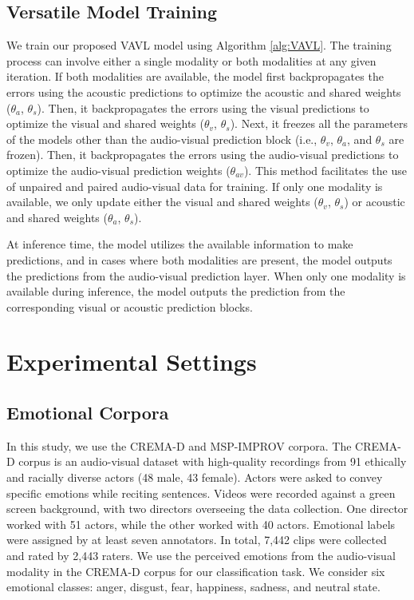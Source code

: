 \documentclass{article}
\begin{document}
\subsection{Versatile Model Training}
\label{ssec:training}

We train our proposed VAVL model using Algorithm \ref{alg:VAVL}. The training process can involve either a single modality or both modalities at any given iteration. If both modalities are available, the model first backpropagates the errors using the acoustic predictions to optimize the acoustic and shared weights ($\theta_a$, $\theta_s$). Then, it backpropagates the errors using the visual predictions to optimize the visual and shared weights ($\theta_v$, $\theta_s$). Next, it freezes all the parameters of the models other than the audio-visual prediction block (i.e., $\theta_v$, $\theta_a$, and $\theta_s$ are frozen). Then, it backpropagates the errors using the audio-visual predictions to optimize the audio-visual prediction weights ($\theta_{av}$). This method facilitates the use of unpaired and paired audio-visual data for training. If only one modality is available, we only update either the visual and shared weights ($\theta_v$, $\theta_s$) or acoustic and shared weights ($\theta_a$, $\theta_s$). 

At inference time, the model utilizes the available information to make predictions, and in cases where both modalities are present, the model outputs the predictions from the audio-visual prediction layer. When only one modality is available during inference, the model outputs the prediction from the corresponding visual or acoustic prediction blocks.
  

\section{Experimental Settings}
\label{sec:experiments}

\subsection{Emotional Corpora}
\label{ssec:corpora}

In this study, we use the CREMA-D \cite{Cao_2014_2} and MSP-IMPROV \cite{Busso_2017} corpora. The CREMA-D corpus is an audio-visual dataset with high-quality recordings from 91 ethically and racially diverse actors (48 male, 43 female). Actors were asked to convey specific emotions while reciting sentences. Videos were recorded against a green screen background, with two directors overseeing the data collection. One director worked with 51 actors, while the other worked with 40 actors. Emotional labels were assigned by at least seven annotators. In total, 7,442 clips were collected and rated by 2,443 raters. We use the perceived emotions from the audio-visual modality in the CREMA-D corpus for our classification task. We consider six emotional classes: anger, disgust, fear, happiness, sadness, and neutral state.
\end{document}
